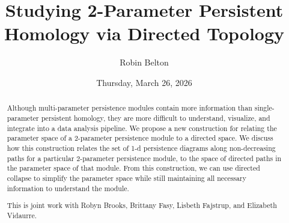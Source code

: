\documentclass{UAmathtalk}
\author{Robin Belton}
\title{Studying 2-Parameter Persistent Homology via Directed Topology}
\date{Thursday, March 26, 2026}
\begin{document}
\maketitle

\begin{abstract}
Although multi-parameter persistence modules contain more information than single-parameter persistent homology, they are more difficult to understand, visualize, and integrate into a data analysis pipeline. We propose a new construction for relating the parameter space of a 2-parameter persistence module to a directed space. We discuss how this construction relates the set of 1-d persistence diagrams along non-decreasing paths for a particular 2-parameter persistence module, to the space of directed paths in the parameter space of that module. From this construction, we can use directed collapse to simplify the parameter space while still maintaining all necessary information to understand the module.

This is joint work with Robyn Brooks, Brittany Fasy, Lisbeth Fajstrup, and Elizabeth Vidaurre.
\end{abstract}
\end{document}
